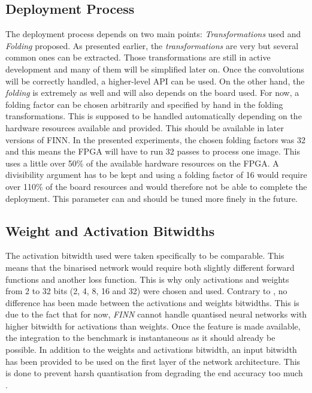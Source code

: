 
\subsection{Deployment Process}

The deployment process depends on two main points: \emph{Transformations} used and \emph{Folding} proposed. As presented earlier, the \emph{transformations} are very  but several common ones can be extracted. Those transformations are still in active development and many of them will be simplified later on. Once the convolutions will be correctly handled, a higher-level API can be used. On the other hand, the \emph{folding} is extremely  as well and will also depends on the board used. For now, a folding factor can be chosen arbitrarily and specified by hand in the folding transformations. This is supposed to be handled automatically depending on the hardware resources available and provided. This should be available in later versions of FINN. In the presented experiments, the chosen folding factors was 32 and this means the FPGA will have to run 32 passes to process one image. This uses a little over 50\% of the available hardware resources on the FPGA. A divisibility argument has to be kept and using a folding factor of 16 would require over 110\% of the board resources and would therefore not be able to complete the deployment. This parameter can and should be tuned more finely in the future.


\subsection{Weight and Activation Bitwidths}

The activation bitwidth used were taken specifically to be comparable. This means that the binarised network would require both slightly different forward functions and another loss function. This is why only activations and weights from 2 to 32 bits (2, 4, 8, 16 and 32) were chosen and used. Contrary to \cite{Bacchus2020}, no difference has been made between the activations and weights bitwidths. This is due to the fact that for now, \emph{FINN} cannot handle quantised neural networks with higher bitwidth for activations than weights. Once the feature is made available, the integration to the benchmark is instantaneous as it should already be possible. In addition to the weights and activations bitwidth, an input bitwidth has been provided to be used on the first layer of the network architecture. This is done to prevent harsh quantisation from degrading the end accuracy too much \cite{}.

